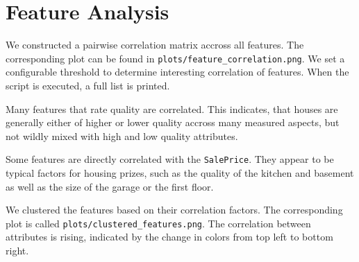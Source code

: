 \section{Feature Analysis}

We constructed a pairwise correlation matrix accross all features. The corresponding plot can be found in \texttt{plots/feature_correlation.png}. We set a configurable threshold to determine interesting correlation of features. When the script is executed, a full list is printed.

Many features that rate quality are correlated. This indicates, that houses are generally either of higher or lower quality accross many measured aspects, but not wildly mixed with high and low quality attributes.

Some features are directly correlated with the \texttt{SalePrice}. They appear to be typical factors for housing prizes, such as the quality of the kitchen and basement as well as the size of the garage or the first floor.

We clustered the features based on their correlation factors. The corresponding plot is called \texttt{plots/clustered_features.png}. The correlation between attributes is rising, indicated by the change in colors from top left to bottom right. 